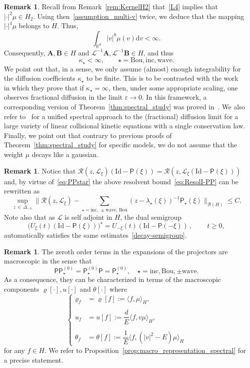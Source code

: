\documentclass[10pt]{amsart}
\theoremstyle{definition}\newtheorem{defi}[theo]{Definition}\newtheorem{rema}[theo]{Remark}\newtheorem{exam}[theo]{Example}\newtheorem{exem}[theo]{Example}\newtheorem{nota}[theo]{Notation}
\newcommand{\Id}{\mathrm{Id}}
\renewcommand{\d}{\mathrm{d}}
\newcommand{\Wave}{\mathrm{wave}}
\newcommand{\Inc}{\mathrm{inc}}
\newcommand{\Bou}{\mathrm{Bou}}
\newcommand{\BurA}{{\mathbf{A}}}
\newcommand{\BurB}{{\mathbf{B}}}
\newcommand{\R}{\mathbb{R}}
\newcommand{\LL}{\mathcal{L}}
\newcommand{\PP}{\mathsf{P}}
\newcommand{\RR}{\mathcal{R}}
\newcommand{\BBB}{\mathscr{B}}
\newcommand{\Ss}{H}
\renewcommand*\leq{\leqslant}
\renewcommand*\geq{\geqslant}
\newcommand*\eps{{\varepsilon}}
\newcommand{\la}{\langle}
\newcommand{\ra}{\rangle}
\begin{document}
\begin{rema}
Recall from Remark~\ref{rem:KernelH2} that~\eqref{L4} implies that $|\cdot|^2\mu \in \Ss_2$. Using then~\eqref{assumption_multi-v} twice, we deduce that the mapping $| \cdot |^4\mu$ belongs to $\Ss$. Thus,
\[
\int_{\R^d}|v|^8\mu(v)\d v < \infty.
\]
Consequently, $\BurA, \BurB \in \Ss$ and $\LL^{-1}\BurA,\LL^{-1}\BurB \in \Ss$, and thus
\[
\kappa_\star < \infty, \qquad \star=\Bou,\Inc,\Wave.
\]
We point out that, in a sense, we only assume (almost) enough integrability for the diffusion coefficients $\kappa_\star$ to be finite. This is to be contrasted with the work~\cite{Mellet} in which they prove that if $\kappa_\star = \infty$, then, under some appropriate scaling, one observes fractional diffusion in the limit $\eps \to 0$. In this framework, a corresponding version of Theorem~\ref{thm:spectral_study} was proved in~\cite{Puel}. We also refer to~\cite{BM} for a unified spectral approach to the (fractional) diffusion limit for a large variety of linear collisional kinetic equations with a single conservation law. Finally, we point out that contrary to previous proofs of Theorem~\ref{thm:spectral_study} for specific models, we do not assume that the weight $\mu$ decays like a gaussian.
\end{rema}
\begin{rema}
Notice that $\RR(z,\LL_{\xi})(\Id-\PP(\xi))=\RR(z,\LL_{\xi}(\Id-\PP(\xi)))$ and, by virtue of~\eqref{eq:PPstar} the above resolvent bound~\eqref{eq:ResolI-PP} can be rewritten as
\[
\sup_{z\, \in\,\Delta_{-\lambda}}\bigg\|\RR(z,\LL_{\xi})-\sum_{\star=\Inc,\,\pm\Wave,\,\Bou}\left(z-\lambda_{\star}(\xi)\right)^{-1}\PP_{\star}(\xi)\bigg\|_{\BBB(\Ss)} \leq C.
\]
Note also that as $\LL$ is self adjoint in {$\Ss$}, the dual semigroup
\[
\Big(U_{\xi}(t) \left(\Id - \PP(\xi)\right) \Big)^\star = U_{-\xi}(t) \left(\Id - \PP(-\xi)\right) \,,\, \qquad t \geq 0,
\]
automatically satisfies the same estimates~\eqref{decay-semigroup}.
\end{rema}

\begin{rema}\label{rem:macro_representation_spectral}
The zeroth order terms in the expansions of the projectors are macroscopic in the sense that
\[
\PP \PP^{(0)}_\star = \PP^{(0)}_\star \PP = \PP^{(0)}_\star, \quad \star = \Inc, \Bou, \pm \Wave.
\]
As a consequence, they can be characterized in terms of the macroscopic components $\varrho[\cdot], u[\cdot]$ and $\theta[\cdot]$ where
\begin{equation}\label{eq:fluctuat}
\begin{cases}
\varrho_f &= \varrho[f] := \la f, \mu \ra_\Ss, \\
\\
u_f & = u[f] := \dfrac{d}{E} \la f, v \mu \ra_\Ss,\\
\\
\theta_f &= \theta[f] := \dfrac{1}{E} \big\la f, \left(|v|^2 - E\right) \mu \big\ra_\Ss
\end{cases}
\end{equation}
for any $f\in \Ss.$ We refer to Proposition~\ref{prop:macro_representation_spectral} for a precise statement.
\end{rema}
\end{document}
